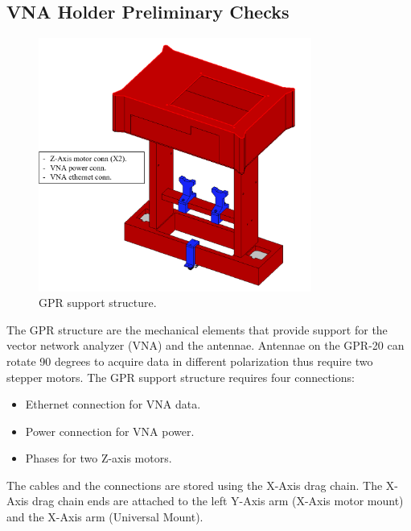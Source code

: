 \documentclass{article}
\begin{document}
\subsection{VNA Holder Preliminary Checks}
\begin{figure}[H]
    \centering
    \includegraphics[width=0.8\textwidth]{images/requirements/text_gpr.png}
    \caption{GPR support structure.}
    \label{fig:considerations_gpr}
\end{figure}
The GPR structure are the mechanical elements that provide support for the vector network analyzer (VNA) and the antennae. Antennae on the GPR-20 can rotate 90 degrees to acquire data in different polarization thus require two stepper motors. The GPR support structure requires four connections:
\begin{itemize}
    \item Ethernet connection for VNA data.
    \item Power connection for VNA power.
    \item Phases for two Z-axis motors.
\end{itemize}
The cables and the connections are stored using the X-Axis drag chain. The X-Axis drag chain ends are attached to the left Y-Axis arm (X-Axis motor mount) and the X-Axis arm (Universal Mount). 
\end{document}
